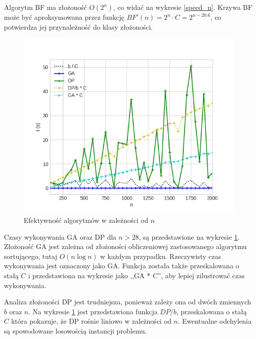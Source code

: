 \documentclass[11pt,twocolumn]{article}
\begin{document}
Algorytm BF ma złożoność $O(2^n)$, co widać na wykresie \ref{speed_n}.
Krzywa BF może być aproksymowana przez funkcję
$BF'(n) = 2^n \cdot C = 2^{n - 20.6}$,
co potwierdza jej przynależność do klasy złożoności.

\begin{figure}[h]
	\includegraphics[width=\linewidth]{speed-n-big.png}
	\caption{Efektywność algorytmów w zależności od $n$ \label{speed_n_big}}
\end{figure}

Czasy wykonywania GA oraz DP dla $n > 28$, są przedstawione na wykresie \ref{speed_n_big}.
Złożoność GA jest zależna od złożoności obliczeniowej zastosowanego algorytmu sortującego,
tutaj $O(n \log n)$ w każdym przypadku. Rzeczywisty czas wykonywania jest oznaczony jako GA.
Funkcja została także przeskalowana o stałą $C$ i przedstawiona na wykresie jako ,,GA * C'',
aby lepiej zilustrować czas wykonywania.

Analiza złożoności DP jest trudniejsza, 
ponieważ zależy ona od dwóch zmiennych $b$ oraz $n$.
Na wykresie \ref{speed_n_big} jest przedstawiona funkcja $DP/b$,
przeskalowana o stałą $C$ która pokazuje, że 
DP rośnie liniowo w zależności od $n$.
Ewentualne odchylenia są spowodowane losowością instancji problemu.
\end{document}
